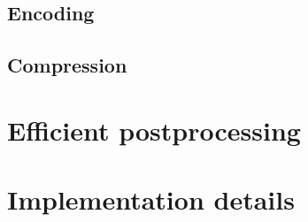 

\subsection {Encoding}

\subsection {Compression}

\section{Efficient postprocessing}
\label{sec:efficient-postprocessing}


\section{Implementation details}
\label{sec:implementation-details}


